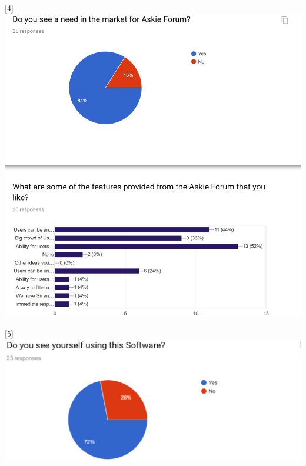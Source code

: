 \documentclass[12pt]{article}
\begin{document}
\begin{center}
[4] \includegraphics[width=\textwidth]{Assignments_reference_4}


[5] \includegraphics[width=\textwidth]{Assignments_reference_5}
\end{center}
\end{document}
